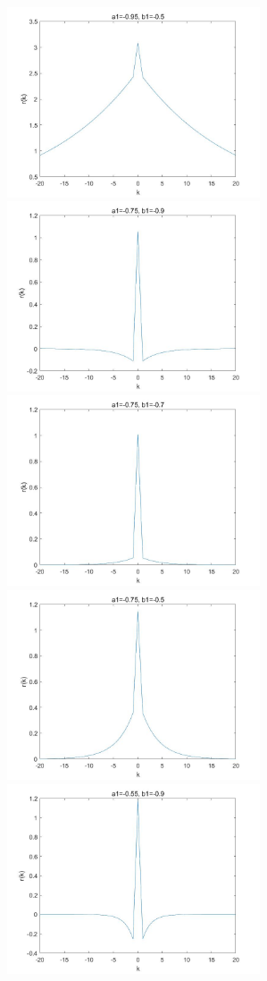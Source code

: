 \documentclass[UTF-8, a4paper, 12pt]{ctexart}
\begin{document}
\begin{figure}[htbp]
    \centering
   
    
    \includegraphics[width=7.5cm]{1/3.jpg}
    \includegraphics[width=7.5cm]{1/4.jpg}
    \includegraphics[width=7.5cm]{1/5.jpg}
    \includegraphics[width=7.5cm]{1/6.jpg}
    \includegraphics[width=7.5cm]{1/7.jpg}

\end{figure}
\end{document}

